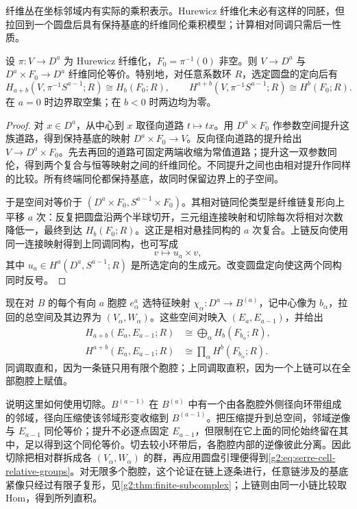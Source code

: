 纤维丛在坐标邻域内有实际的乘积表示。Hurewicz 纤维化未必有这样的同胚，但拉回到一个圆盘后具有保持基底的纤维同伦乘积模型；计算相对同调只需后一性质。

\begin{lemma}\label{g2:lem:fibration-disk-model}
	设 \(\pi:V\to D^a\) 为 Hurewicz 纤维化，\(F_0=\pi^{-1}(0)\) 非空。则 \(V\to D^a\) 与 \(D^a\times F_0\to D^a\) 纤维同伦等价。特别地，对任意系数环 \(R\)，选定圆盘的定向后有
	\[
		H_{a+b}(V,\pi^{-1}S^{a-1};R)\cong H_b(F_0;R),\qquad
		H^{a+b}(V,\pi^{-1}S^{a-1};R)\cong H^b(F_0;R).
	\]
	在 \(a=0\) 时边界取空集；在 \(b<0\) 时两边均为零。
\end{lemma}
\begin{proof}
	对 \(x\in D^a\)，从中心到 \(x\) 取径向道路 \(t\mapsto tx\)。用 \(D^a\times F_0\) 作参数空间提升这族道路，得到保持基底的映射 \(D^a\times F_0\to V\)。反向径向道路的提升给出 \(V\to D^a\times F_0\)。先去再回的道路可固定两端收缩为常值道路；提升这一双参数同伦，得到两个复合与恒等映射之间的纤维同伦。不同提升之间也由相对提升作同样的比较。所有终端同伦都保持基底，故同时保留边界上的子空间。

	于是空间对等价于 \((D^a\times F_0,S^{a-1}\times F_0)\)。其相对链同伦类型是纤维链复形向上平移 \(a\) 次：反复把圆盘沿两个半球切开，三元组连接映射和切除每次将相对次数降低一，最终到达 \(H_b(F_0;R)\)。这正是相对悬挂同构的 \(a\) 次复合。上链反向使用同一连接映射得到上同调同构，也可写成
	\[
		v\longmapsto u_a\times v,
	\]
	其中 \(u_a\in H^a(D^a,S^{a-1};R)\) 是所选定向的生成元。改变圆盘定向使这两个同构同时反号。
\end{proof}

现在对 \(B\) 的每个有向 \(a\) 胞腔 \(e_\alpha^a\) 选特征映射 \(\chi_\alpha:D^a\to B^{(a)}\)，记中心像为 \(b_\alpha\)，拉回的总空间及其边界为 \((V_\alpha,W_\alpha)\)。这些空间对映入 \((E_a,E_{a-1})\)，并给出
\begin{equation}\label{g2:eq:serre-cell-relative-groups}
\begin{aligned}
	H_{a+b}(E_a,E_{a-1};R)&\cong\bigoplus_\alpha H_b(F_{b_\alpha};R),\\
	H^{a+b}(E_a,E_{a-1};R)&\cong\prod_\alpha H^b(F_{b_\alpha};R).
\end{aligned}
\end{equation}
同调取直和，因为一条链只用有限个胞腔；上同调取直积，因为一个上链可以在全部胞腔上赋值。

\ProseParagraphBreak

说明这里如何使用切除。\(B^{(a-1)}\) 在 \(B^{(a)}\) 中有一个由各胞腔外侧径向环带组成的邻域，径向压缩使该邻域形变收缩到 \(B^{(a-1)}\)。把压缩提升到总空间，邻域逆像与 \(E_{a-1}\) 同伦等价；提升不必逐点固定 \(E_{a-1}\)，但限制在它上面的同伦始终留在其中，足以得到这个同伦等价。切去较小环带后，各胞腔内部的逆像彼此分离。因此切除把相对群拆成各 \((V_\alpha,W_\alpha)\) 的群，再应用圆盘引理便得到\eqref{g2:eq:serre-cell-relative-groups}。对无限多个胞腔，这个论证在链上逐条进行，任意链涉及的基底紧像只经过有限子复形，见\cref{g2:thm:finite-subcomplex}；上链则由同一小链比较取 Hom，得到所列直积。

